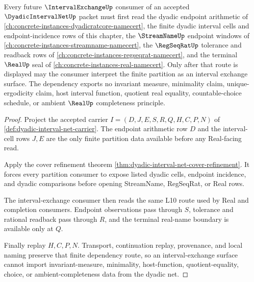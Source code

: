 \begin{theorem}
\label{thm:dyadic-interval-net-interval-exchange-dependency-route}
Every future $\IntervalExchangeUp$ consumer of an accepted $\DyadicIntervalNetUp$ packet must first read the dyadic endpoint arithmetic of \autoref{ch:concrete-instances-dyadicratcore-namecert}, the finite dyadic interval cells and endpoint-incidence rows of this chapter, the $\StreamNameUp$ endpoint windows of \autoref{ch:concrete-instances-streamname-namecert}, the $\RegSeqRatUp$ tolerance and readback rows of \autoref{ch:concrete-instances-regseqrat-namecert}, and the terminal $\RealUp$ seal of \autoref{ch:concrete-instances-real-namecert}. Only after that route is displayed may the consumer interpret the finite partition as an interval exchange surface. The dependency exports no invariant measure, minimality claim, unique-ergodicity claim, host interval function, quotient real equality, countable-choice schedule, or ambient $\RealUp$ completeness principle.
\end{theorem}
\begin{proof}
Project the accepted carrier $I=(D,J,E,S,R,Q,H,C,P,N)$ of \autoref{def:dyadic-interval-net-carrier}. The endpoint arithmetic row $D$ and the interval-cell rows $J,E$ are the only finite partition data available before any Real-facing read.

Apply the cover refinement theorem \autoref{thm:dyadic-interval-net-cover-refinement}. It forces every partition consumer to expose listed dyadic cells, endpoint incidence, and dyadic comparisons before opening StreamName, RegSeqRat, or Real rows.

The interval-exchange consumer then reads the same L10 route used by Real and completion consumers. Endpoint observations pass through $S$, tolerance and rational readback pass through $R$, and the terminal real-name boundary is available only at $Q$.

Finally replay $H,C,P,N$. Transport, continuation replay, provenance, and local naming preserve that finite dependency route, so an interval-exchange surface cannot import invariant-measure, minimality, host-function, quotient-equality, choice, or ambient-completeness data from the dyadic net.
\end{proof}
